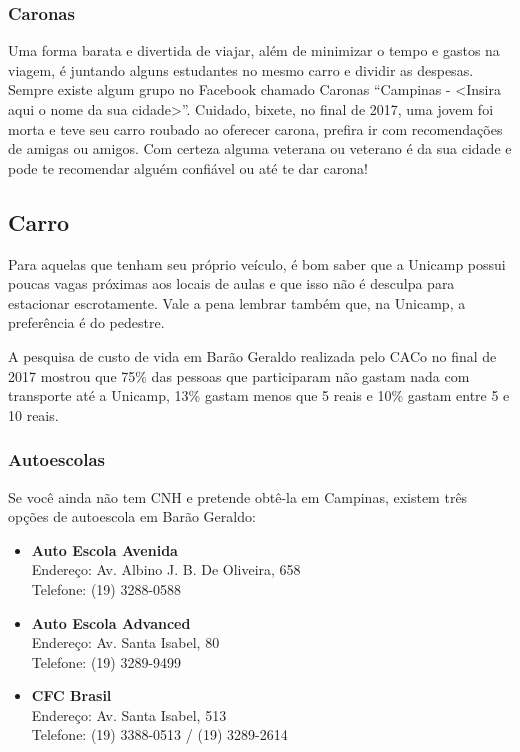 \subsubsection{Caronas}

Uma forma barata e divertida de viajar, além de minimizar o tempo e gastos na
viagem, é juntando alguns estudantes no mesmo carro e dividir as despesas.
Sempre existe algum grupo no Facebook chamado Caronas ``Campinas - <Insira aqui
o nome da sua cidade>''. Cuidado, bixete, no final de 2017, uma jovem foi morta
e teve seu carro roubado ao oferecer carona, prefira ir com recomendações de
amigas ou amigos. Com certeza alguma veterana ou veterano é da sua cidade e
pode te recomendar alguém confiável ou até te dar carona!

\subsection{Carro}

Para aquelas que tenham seu próprio veículo, é bom saber que a Unicamp possui
poucas vagas próximas aos locais de aulas e que isso não é desculpa para
estacionar escrotamente. Vale a pena lembrar também que, na Unicamp, a
preferência é do pedestre.

A pesquisa de custo de vida em Barão Geraldo realizada pelo CACo no final de
2017 mostrou que 75\% das pessoas que participaram não gastam nada com
transporte até a Unicamp, 13\% gastam menos que 5 reais e 10\% gastam entre 5 e
10 reais.

\subsubsection{Autoescolas}

Se você ainda não tem CNH e pretende obtê-la em Campinas, existem três opções
de autoescola em Barão Geraldo:

\begin{itemize}
\item \textbf{Auto Escola Avenida}
  \\Endereço: Av. Albino J. B. De Oliveira, 658
  \\Telefone: (19) 3288-0588

\item \textbf{Auto Escola Advanced}
  \\Endereço: Av. Santa Isabel, 80
  \\Telefone: (19) 3289-9499

\item \textbf{CFC Brasil}
  \\Endereço: Av. Santa Isabel, 513
  \\Telefone: (19) 3388-0513 / (19) 3289-2614
\end{itemize}

